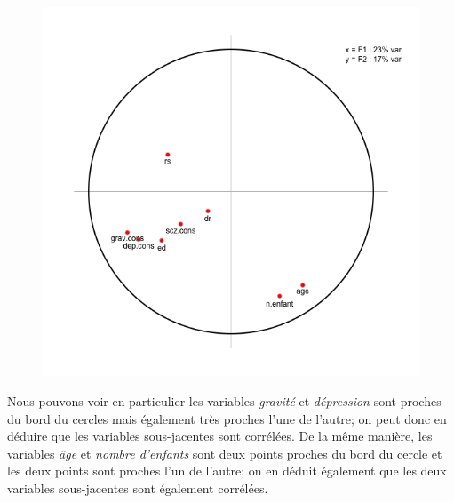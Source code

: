 \begin{figure}[H]\begin{center}\includegraphics[scale=0.5]{ilu/ACPvierge.png}\end{center}\end{figure}

Nous pouvons voir en particulier les variables \textit{gravité} et \textit{dépression} sont proches du bord du cercles mais également très proches l'une de l'autre; on peut donc en déduire que les variables sous-jacentes sont corrélées. De la même manière, les variables \textit{âge} et \textit{nombre d'enfants} sont deux points proches du bord du cercle et les deux points sont proches l'un de l'autre; on en déduit également que les deux variables sous-jacentes sont également corrélées.

